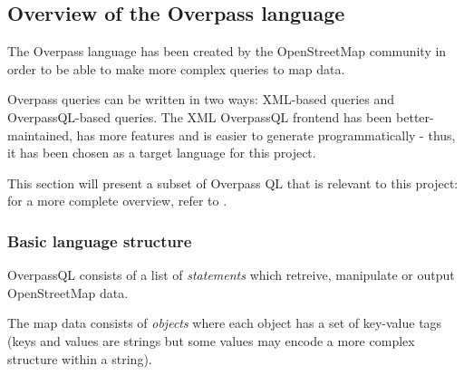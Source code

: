 \documentclass[main.tex]{subfiles}
\begin{document}
\subsection{Overview of the Overpass language}
The Overpass language \cite{overpass} has been created by the OpenStreetMap
community in order to be able to make more complex queries to map data. 

Overpass queries can be written in two ways: XML-based queries and OverpassQL-based
queries. The XML OverpassQL frontend has been better-maintained, has more features
and is easier to generate programmatically - thus, it has been chosen as a target
language for this project.

This section will present a subset of Overpass QL that is relevant to this project: for a
more complete overview, refer to \cite{overpassql}.

\subsubsection{Basic language structure}
OverpassQL consists of a list of \emph{statements} which retreive, manipulate
or output OpenStreetMap data.

The map data consists of \emph{objects} where each object has a set of key-value
tags (keys and values are strings but some values may encode a more complex
structure within a string).
\end{document}
